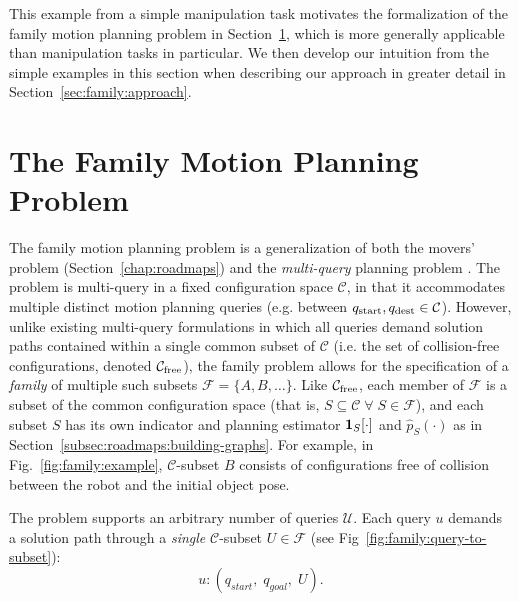 This example from a simple manipulation task motivates
the formalization of the family motion planning problem
in Section~\ref{sec:family:formulation},
which is more generally applicable than manipulation tasks
in particular.
We then develop our intuition from the simple examples in this section
when describing our approach in greater detail
in Section~\ref{sec:family:approach}.

\section{The Family Motion Planning Problem}
\label{sec:family:formulation}

The family motion planning problem is
a generalization of both the movers' problem
(Section~\ref{chap:roadmaps})
and the \emph{multi-query} planning problem
\citep{kavrakietal1996prm}.
The problem is multi-query in
a fixed configuration space $\mathcal{C}$,
in that it accommodates multiple distinct motion planning queries
(e.g. between $q_{\mbox{\scriptsize start}},q_{\mbox{\scriptsize dest}} \in \mathcal{C}$).
However, unlike existing multi-query formulations in which all
queries demand solution paths contained within a single common subset of
$\mathcal{C}$
(i.e. the set of collision-free configurations, denoted
$\mathcal{C}_{\mbox{\scriptsize free}}$),
the family problem allows for the specification of
a \emph{family} of multiple such subsets
$\mathcal{F} = \{ A, B, \dots \}$.
Like $\mathcal{C}_{\mbox{\scriptsize free}}$,
each member of $\mathcal{F}$
is a subset of the common configuration space
(that is,
$S \subseteq \mathcal{C} \;\forall\; S \in \mathcal{F}$),
and each subset $S$ has its own indicator and planning estimator
${\bf 1}_S[\cdot]$ and $\hat{p}_S(\cdot)$
as in Section~\ref{subsec:roadmaps:building-graphs}.
For example,
in Fig.~\ref{fig:family:example},
$\mathcal{C}$-subset $B$
consists of configurations
free of collision between the robot and
the initial object pose.

The problem supports an arbitrary number of queries $\mathcal{U}$.
Each query $u$ demands a solution path through a \emph{single}
$\mathcal{C}$-subset $U \in \mathcal{F}$
(see Fig~\ref{fig:family:query-to-subset}):
\begin{equation}
  u : ( q_{start},\; q_{goal},\; U ) .
  \label{eqn:family:q}
\end{equation}

